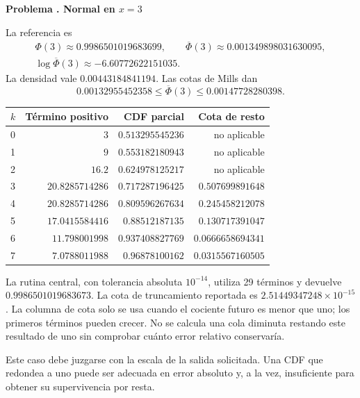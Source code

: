 \documentclass[11pt,a4paper]{article}
\theoremstyle{definition}
\newcommand{\Q}{\overline\Phi}
\newcounter{problema}
\newenvironment{resuelto}[1]{\refstepcounter{problema}\par\medskip\Needspace{6\baselineskip}\textbf{Problema \theproblema. #1}\par}{\par\medskip}
\begin{document}
\begin{resuelto}{Normal en $x=3$}
La referencia es
\[
\begin{gathered}
\Phi(3)\approx0.9986501019683699,\qquad \Q(3)\approx0.001349898031630095,\\
\log\Q(3)\approx-6.60772622151035.
\end{gathered}
\]
La densidad vale $0.00443184841194$. Las cotas de Mills dan
\[
0.00132955452358\le\Q(3)\le0.00147728280398.
\]

\begin{center}\small\begin{tabular}{lrrr}
\toprule
$k$ & Término positivo & CDF parcial & Cota de resto\\\midrule
0 & $3$ & $0.513295545236$ & no aplicable\\
1 & $9$ & $0.553182180943$ & no aplicable\\
2 & $16.2$ & $0.624978125217$ & no aplicable\\
3 & $20.8285714286$ & $0.717287196425$ & $0.507699891648$\\
4 & $20.8285714286$ & $0.809596267634$ & $0.245458212078$\\
5 & $17.0415584416$ & $0.88512187135$ & $0.130717391047$\\
6 & $11.798001998$ & $0.937408827769$ & $0.0666658694341$\\
7 & $7.0788011988$ & $0.96878100162$ & $0.0315567160505$\\
\bottomrule\end{tabular}\end{center}

La rutina central, con tolerancia absoluta $10^{-14}$, utiliza 29 términos y devuelve $0.9986501019683673$. La cota de truncamiento reportada es $2.51449347248\times10^{-15}$. La columna de cota solo se usa cuando el cociente futuro es menor que uno; los primeros términos pueden crecer.
No se calcula una cola diminuta restando este resultado de uno sin comprobar cuánto error relativo conservaría.

Este caso debe juzgarse con la escala de la salida solicitada. Una CDF que redondea a uno puede ser adecuada en error absoluto y, a la vez, insuficiente para obtener su supervivencia por resta.
\end{resuelto}
\end{document}
